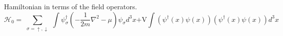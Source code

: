\documentclass{article}
\begin{document}
Hamiltonian in terms of the field operators.
\begin{equation}
    \mathcal{H}_0=
    \sum_{\substack{
        \sigma=\uparrow,\downarrow
    }}
    \int{
        \psi^\dagger_\sigma\left(-\frac{1}{2m}\nabla^2-\mu\right)\psi_\sigma{d^3}x
    }
    {\textrm{+V}}
    \int{
        (\psi^\dagger(x)\psi(x))(\psi^\dagger(x)\psi(x)){d^3}x
    }
\end{equation}
\end{document}
